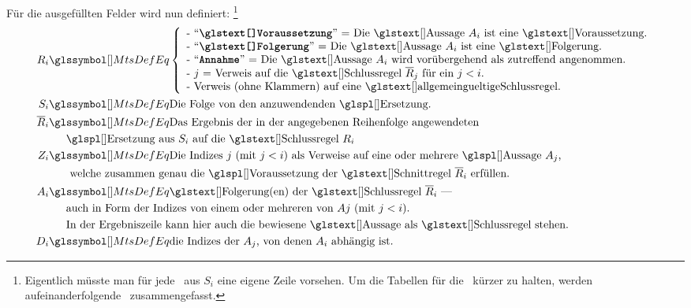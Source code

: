{Für die ausgefüllten Felder wird nun definiert:%
\footnote{%
	Eigentlich müsste man für jede \Ersetzung\ aus $S_i$ eine eigene Zeile vorsehen.
	Um die Tabellen für die \Beweise\ kürzer zu halten, werden aufeinanderfolgende \Ersetzungen\ zusammengefasst.
}
\begin{align}
	R_i & \MtsDefEq
	\left\{
		\begin{array}{l}
			\text{- \strqt{\Voraussetzung} = Die \Aussage\ $A_i$ ist eine \Voraussetzung.}\\
			\text{- \strqt{\Folgerung} = Die \Aussage\ $A_i$ ist eine \Folgerung.}\\
			\text{- \strqt{Annahme} = Die \Aussage\ $A_i$ wird vorübergehend als zutreffend angenommen.}\\
			\text{- $j$ = Verweis auf die \Schlussregel\ $\overline{R}_j$ für ein $j < i$.}\\
			\text{- Verweis (ohne Klammern) auf eine \allgemeingueltigeSchlussregel.}
		\end{array}
	\right.
	\\
	S_i & \MtsDefEq \text{Die Folge von den anzuwendenden \Ersetzungen.}
	\\
	\overline{R}_i & \MtsDefEq \text{Das Ergebnis der in der angegebenen Reihenfolge angewendeten}\\
	& \quad\;\; \text{\Ersetzungen\ aus $S_i$ auf die \Schlussregel\ $R_i$}
	\\
	Z_i & \MtsDefEq \text{Die Indizes $j$ (mit $j < i$) als Verweise auf eine oder mehrere \Aussagen\ $A_j$,}\\
	& \quad\;\;\text{ welche zusammen genau die \Voraussetzungen\ der \Schnittregel\ } \overline{R}_i \text{ erfüllen.}
	\\
	A_i & \MtsDefEq \text{\Folgerung(en) der \Schlussregel\ $\overline{R}_i$ ---}\\
	& \quad\;\; \text{auch in Form der Indizes von einem oder mehreren von $Aj$ (mit $j < i$).}\\
	& \quad\;\; \text{In der Ergebniszeile kann hier auch die bewiesene \Aussage\ als \Schlussregel\ stehen.}
	\\
	D_i & \MtsDefEq \text{die Indizes der $A_j$, von denen $A_i$ abhängig ist.}
\end{align}

}
